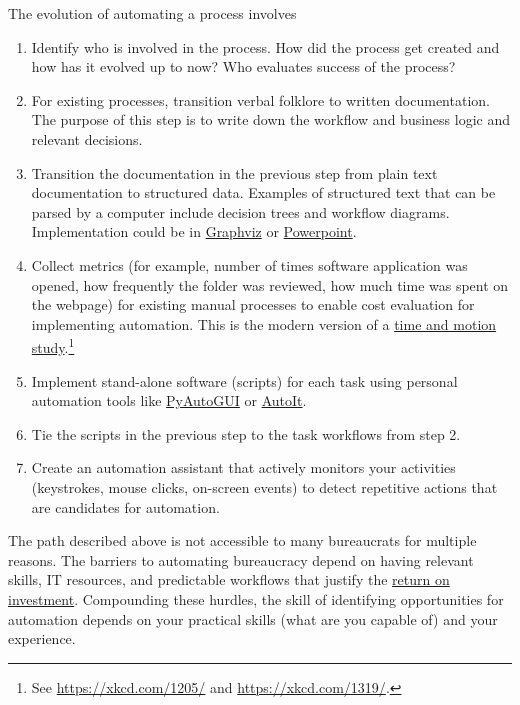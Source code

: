 The evolution of automating a process involves
\begin{enumerate}
    \item Identify who is involved in the process. How did the process get created and how has it evolved up to now? Who evaluates success of the process? 
    \item For existing processes, transition verbal folklore to written documentation. The purpose of this step is to write down the workflow and business logic and relevant decisions. 
    \item Transition the documentation in the previous step from plain text documentation to structured data. Examples of structured text that can be parsed by a computer include  decision trees and workflow diagrams. Implementation could be in 
    \href{https://en.wikipedia.org/wiki/Graphviz}{Graphviz} or  \href{https://en.wikipedia.org/wiki/Microsoft_PowerPoint}{Powerpoint}.
    \item Collect metrics (for example, number of times software application was opened, how frequently the folder was reviewed, how much  time was spent on the webpage) for existing manual processes to enable cost evaluation for implementing automation. This is the modern version of a
    \href{https://en.wikipedia.org/wiki/Time_and_motion_study}{time and motion study}.\footnote{See \href{https://xkcd.com/1205/}{https://xkcd.com/1205/} and \href{https://xkcd.com/1319/}{https://xkcd.com/1319/}.}
    \item Implement stand-alone software (scripts) for each task using personal automation tools like \href{https://pyautogui.readthedocs.io/en/latest/}{PyAutoGUI} or \href{https://www.autoitscript.com/site/}{AutoIt}.
    \item Tie the scripts in the previous step to the task workflows from step 2.
    \item Create an automation assistant that actively monitors your activities (keystrokes, mouse clicks, on-screen events) to detect repetitive actions that are candidates for automation.
\end{enumerate}

The path described above is not accessible to many bureaucrats for multiple reasons. 
The barriers to automating bureaucracy depend on having relevant skills, IT resources, and predictable workflows that justify the
\href{https://en.wikipedia.org/wiki/Return_on_investment}{return on investment}. Compounding these hurdles, the skill of identifying opportunities for automation depends on your practical skills (what are you capable of) and your experience.

